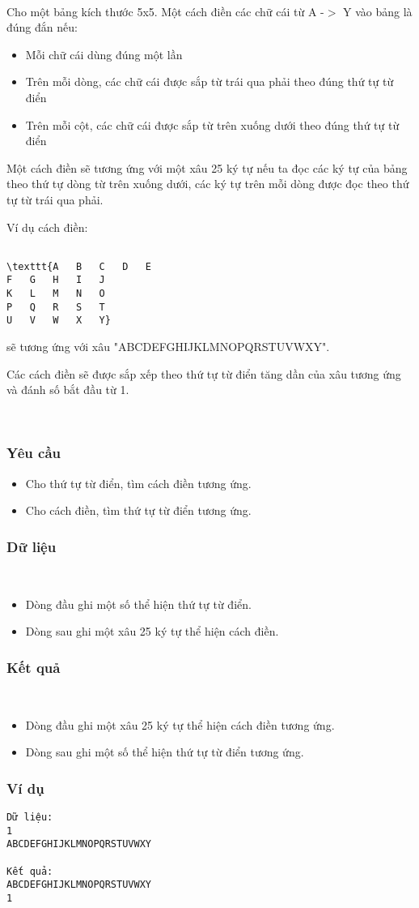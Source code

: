 

 

Cho một bảng kích thước 5x5. Một cách điền các chữ cái từ A -$>$ Y vào bảng là đúng đắn nếu:
\begin{itemize}
	\item Mỗi chữ cái dùng đúng một lần
	\item Trên mỗi dòng, các chữ cái được sắp từ trái qua phải theo đúng thứ tự từ điển
	\item Trên mỗi cột, các chữ cái được sắp từ trên xuống dưới theo đúng thứ tự từ điển
\end{itemize}

Một cách điền sẽ tương ứng với một xâu 25 ký tự nếu ta đọc các ký tự của bảng theo thứ tự dòng từ trên xuống dưới, các ký tự trên mỗi dòng được đọc theo thứ tự từ trái qua phải.

Ví dụ cách điền:
\begin{verbatim}

\texttt{A	B	C	D	E
F	G	H	I	J
K	L	M	N	O
P	Q	R	S	T
U	V	W	X	Y}\end{verbatim}

sẽ tương ứng với xâu "ABCDEFGHIJKLMNOPQRSTUVWXY".

Các cách điền sẽ được sắp xếp theo thứ tự từ điển tăng dần của xâu tương ứng và đánh số bắt đầu từ 1.

 

\subsubsection{Yêu cầu}
\begin{itemize}
	\item Cho thứ tự từ điển, tìm cách điền tương ứng.
	\item Cho cách điền, tìm thứ tự từ điển tương ứng.
\end{itemize}

\subsubsection{Dữ liệu}

 
\begin{itemize}
	\item Dòng đầu ghi một số thể hiện thứ tự từ điển.
	\item Dòng sau ghi một xâu 25 ký tự thể hiện cách điền.
\end{itemize}

\subsubsection{Kết quả}

 
\begin{itemize}
	\item Dòng đầu ghi một xâu 25 ký tự thể hiện cách điền tương ứng.
	\item Dòng sau ghi một số thể hiện thứ tự từ điển tương ứng.
\end{itemize}

\subsubsection{Ví dụ}
\begin{verbatim}
Dữ liệu:
1
ABCDEFGHIJKLMNOPQRSTUVWXY

Kết quả:
ABCDEFGHIJKLMNOPQRSTUVWXY
1
\end{verbatim}